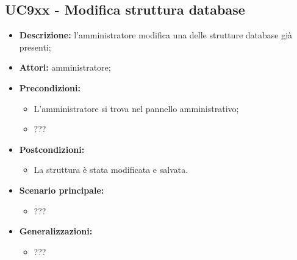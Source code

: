 \subsection{UC9xx - Modifica struttura database}
\label{sec:UC9xxx}
\begin{itemize}
	\item \textbf{Descrizione:}  l’amministratore modifica una delle strutture database già presenti;
	\item \textbf{Attori:} amministratore;
	\item \textbf{Precondizioni:} 
	\begin{itemize}
		\item L’amministratore si trova nel pannello amministrativo;
		\item ???
	\end{itemize}
	\item \textbf{Postcondizioni:} 
	\begin{itemize}
		\item La struttura è stata modificata e salvata.
	\end{itemize}
	\item \textbf{Scenario principale:} 
	\begin{itemize}
		\item ???
	\end{itemize}
	\item \textbf{Generalizzazioni:} 
	\begin{itemize}
		\item ???
	\end{itemize}
\end{itemize}

